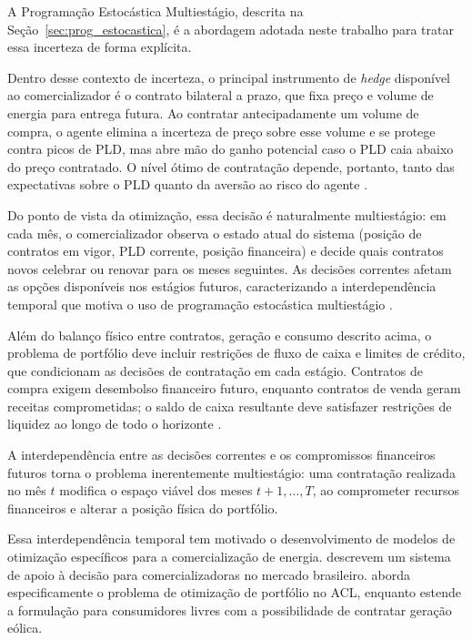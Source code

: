 A Programação Estocástica Multiestágio, descrita na Seção~\ref{sec:prog_estocastica}, é a abordagem adotada neste trabalho para tratar essa incerteza de forma explícita.

Dentro desse contexto de incerteza, o principal instrumento de \emph{hedge} disponível ao comercializador é o contrato bilateral a prazo, que fixa preço e volume de energia para entrega futura. Ao contratar antecipadamente um volume de compra, o agente elimina a incerteza de preço sobre esse volume e se protege contra picos de PLD, mas abre mão do ganho potencial caso o PLD caia abaixo do preço contratado. O nível ótimo de contratação depende, portanto, tanto das expectativas sobre o PLD quanto da aversão ao risco do agente \cite{bessa2006,pedrini2019}.

Do ponto de vista da otimização, essa decisão é naturalmente multiestágio: em cada mês, o comercializador observa o estado atual do sistema (posição de contratos em vigor, PLD corrente, posição financeira) e decide quais contratos novos celebrar ou renovar para os meses seguintes. As decisões correntes afetam as opções disponíveis nos estágios futuros, caracterizando a interdependência temporal que motiva o uso de programação estocástica multiestágio \cite{guerreiro2017}.

Além do balanço físico entre contratos, geração e consumo descrito acima, o problema de portfólio deve incluir restrições de fluxo de caixa e limites de crédito, que condicionam as decisões de contratação em cada estágio. Contratos de compra exigem desembolso financeiro futuro, enquanto contratos de venda geram receitas comprometidas; o saldo de caixa resultante deve satisfazer restrições de liquidez ao longo de todo o horizonte \cite{bessa2006}.

A interdependência entre as decisões correntes e os compromissos financeiros futuros torna o problema inerentemente multiestágio: uma contratação realizada no mês $t$ modifica o espaço viável dos meses $t+1, \ldots, T$, ao comprometer recursos financeiros e alterar a posição física do portfólio.

Essa interdependência temporal tem motivado o desenvolvimento de modelos de otimização específicos para a comercialização de energia.  descrevem um sistema de apoio à decisão para comercializadoras no mercado brasileiro.  aborda especificamente o problema de otimização de portfólio no ACL, enquanto  estende a formulação para consumidores livres com a possibilidade de contratar geração eólica.

